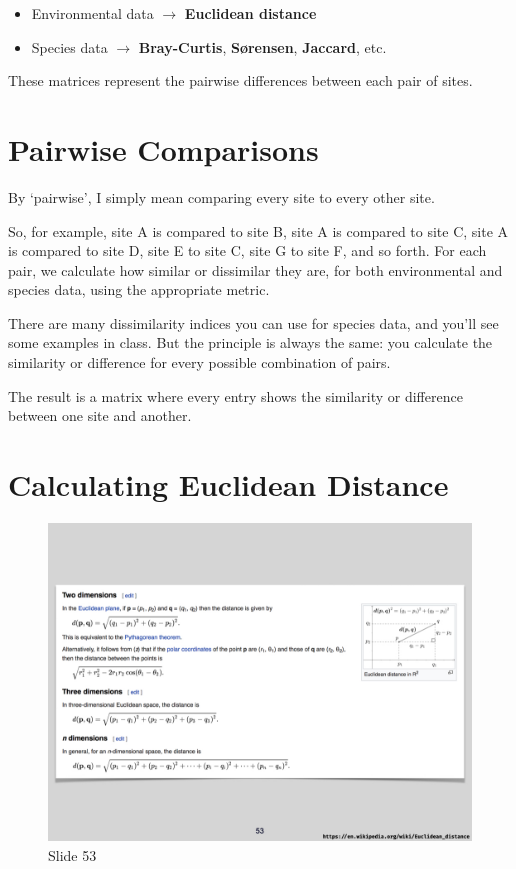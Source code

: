 \documentclass[
  10pt,
]{book}
\providecommand{\tightlist}{%
  \setlength{\itemsep}{0pt}\setlength{\parskip}{0pt}}
\begin{document}
\begin{itemize}
\tightlist
\item
  Environmental data \(\rightarrow\) \textbf{Euclidean distance}
\item
  Species data \(\rightarrow\) \textbf{Bray-Curtis}, \textbf{Sørensen},
  \textbf{Jaccard}, etc.
\end{itemize}

These matrices represent the pairwise differences between each pair of
sites.

\section{Pairwise Comparisons}\label{pairwise-comparisons}

By `pairwise', I simply mean comparing every site to every other site.

So, for example, site A is compared to site B, site A is compared to
site C, site A is compared to site D, site E to site C, site G to site
F, and so forth. For each pair, we calculate how similar or dissimilar
they are, for both environmental and species data, using the appropriate
metric.

There are many dissimilarity indices you can use for species data, and
you'll see some examples in class. But the principle is always the same:
you calculate the similarity or difference for every possible
combination of pairs.

The result is a matrix where every entry shows the similarity or
difference between one site and another.

\section{Calculating Euclidean
Distance}\label{calculating-euclidean-distance}

\begin{figure}[ht]
\centering
\includegraphics[width=0.8\linewidth]{../images/BDC334/BDC334-053.jpeg}
\caption*{Slide 53}
\end{figure}
\end{document}
